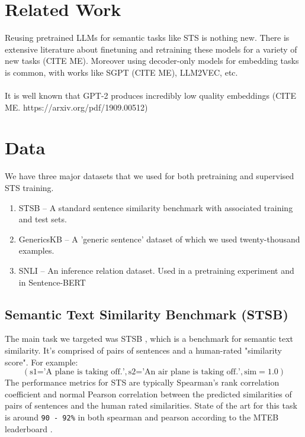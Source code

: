 \documentclass[14pt, twocolumn]{article}
\begin{document}
\section{Related Work}
Reusing pretrained LLMs for semantic tasks like STS is nothing new. There is extensive literature about finetuning and retraining
these models for a variety of new tasks (CITE ME). Moreover using decoder-only models for embedding tasks is common, with works like
SGPT (CITE ME), LLM2VEC, etc.\\\\
It is well known that GPT-2 produces incredibly low quality embeddings (CITE ME. https://arxiv.org/pdf/1909.00512)

\section{Data}
We have three major datasets that we used for both pretraining and supervised STS training.
\begin{enumerate}
    \item STSB \cite{STS} -- A standard sentence similarity benchmark with associated training and test sets.
    \item GenericsKB \cite{bhakthavatsalam2020genericskbknowledgebasegeneric} -- A 'generic sentence' dataset of which we used twenty-thousand examples.
    \item SNLI \cite{snli} -- An inference relation dataset. Used in a pretraining experiment and in Sentence-BERT \cite{reimers2019sentencebertsentenceembeddingsusing}
\end{enumerate}

\subsection{Semantic Text Similarity Benchmark (STSB)} \label{STS-section}
The main task we targeted was STSB \cite{STS}, which is a benchmark for semantic text similarity. It's comprised of pairs of sentences and a human-rated "similarity score". For example:
$$
(\text{s1='A plane is taking off.'}, \text{s2='An air plane is taking off.'}, \text{sim}=1.0)
$$
The performance metrics for STS are typically Spearman's rank correlation coefficient and normal Pearson correlation between the predicted similarities of pairs of sentences and the human rated similarities. State of the art for this task is around \verb|90 - 92%| in both spearman and pearson according to the MTEB leaderboard \cite{muennighoff2022mteb}.
\end{document}
